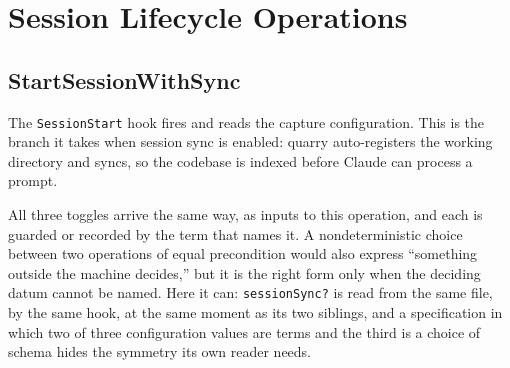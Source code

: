 \documentclass[a4paper,10pt,fleqn]{article}
\begin{document}
\section{Session Lifecycle Operations}

\subsection{StartSessionWithSync}

The \texttt{SessionStart} hook fires and reads the capture configuration.
This is the branch it takes when session sync is enabled: quarry
auto-registers the working directory and syncs, so the codebase is
indexed before Claude can process a prompt.

All three toggles arrive the same way, as inputs to this operation, and
each is guarded or recorded by the term that names it. A nondeterministic
choice between two operations of equal precondition would also express
``something outside the machine decides,'' but it is the right form only
when the deciding datum cannot be named. Here it can: \texttt{sessionSync?}
is read from the same file, by the same hook, at the same moment as its
two siblings, and a specification in which two of three configuration
values are terms and the third is a choice of schema hides the symmetry
its own reader needs.
\end{document}
